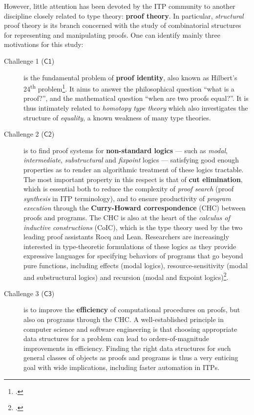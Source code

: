 \documentclass[12pt,draftproposal]{msca-pf}
\newcommand{\CH}[1]{$\mathsf{C#1}$}
\begin{document}
However, little attention has been devoted by the ITP community to another discipline closely
related to type theory: \textbf{proof theory}. In particular, \emph{structural} proof theory is its
branch concerned with the study of combinatorial structures for representing and manipulating
proofs. One can identify mainly three motivations for this study:
\begin{description}
    \item[Challenge 1 (\CH{1})] is the fundamental problem of \textbf{proof identity}, also
    known as Hilbert's 24\textsuperscript{th} problem\footcite{strasburger-problem-2019}. It aims to
    answer the philosophical question ``what is a proof?'', and the mathematical question ``when are
    two proofs equal?''. It is thus intimately related to \emph{homotopy type theory} which also
    investigates the structure of \emph{equality}, a known weakness of many type theories.

    \item[Challenge 2 (\CH{2})] is to find proof systems for \textbf{non-standard logics} ---
    such as \emph{modal}, \emph{intermediate}, \emph{substructural} and \emph{fixpoint} logics ---
    satisfying good enough properties as to render an algorithmic treatment of these logics
    tractable. The most important property in this respect is that of \textbf{cut elimination},
    which is essential both to reduce the complexity of \emph{proof search} (proof \emph{synthesis}
    in ITP terminology), and to ensure productivity of \emph{program execution} through the
    \textbf{Curry-Howard correspondence} (CHC) between proofs and programs. The CHC is also at the
    heart of the \emph{calculus of inductive constructions} (CoIC), which is the type theory used by
    the two leading proof assistants Rocq and Lean. Researchers are increasingly interested in
    type-theoretic formulations of these logics as they provide expressive languages for specifying
    behaviors of programs that go beyond pure functions, including effects (modal logics),
    resource-sensitivity (modal and substructural logics) and recursion (modal and fixpoint
    logics)\footcite{tangModalEffectTypes2025,marshallLinearityUniquenessEntente2022,cloustonGuardedLambdaCalculusProgramming2017}.
    
    \item[Challenge 3 (\CH{3})] is to improve the \textbf{efficiency} of computational
    procedures on proofs, but also on programs through the CHC. A well-established principle in
    computer science and software engineering is that choosing appropriate data structures for a
    problem can lead to orders-of-magnitude improvements in efficiency. Finding the right data
    structures for such general classes of objects as proofs and programs is thus a very enticing
    goal with wide implications, including faster automation in ITPs.
\end{description}
\end{document}
